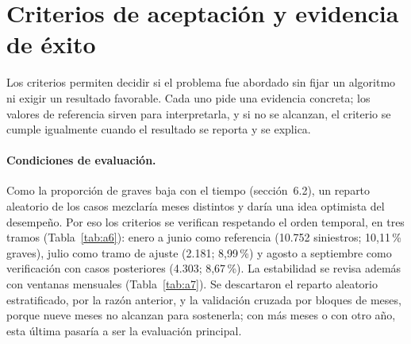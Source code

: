 \section{Criterios de aceptación y evidencia de éxito}

Los criterios permiten decidir si el problema fue abordado sin fijar un algoritmo ni exigir un resultado favorable. Cada uno pide una evidencia concreta; los valores de referencia sirven para interpretarla, y si no se alcanzan, el criterio se cumple igualmente cuando el resultado se reporta y se explica.

\paragraph{Condiciones de evaluación.} Como la proporción de graves baja con el tiempo (sección~6.2), un reparto aleatorio de los casos mezclaría meses distintos y daría una idea optimista del desempeño. Por eso los criterios se verifican respetando el orden temporal, en tres tramos (Tabla~\ref{tab:a6}): enero a junio como referencia (10.752 siniestros; 10,11\,\% graves), julio como tramo de ajuste (2.181; 8,99\,\%) y agosto a septiembre como verificación con casos posteriores (4.303; 8,67\,\%). La estabilidad se revisa además con ventanas mensuales (Tabla~\ref{tab:a7}). Se descartaron el reparto aleatorio estratificado, por la razón anterior, y la validación cruzada por bloques de meses, porque nueve meses no alcanzan para sostenerla; con más meses o con otro año, esta última pasaría a ser la evaluación principal.


